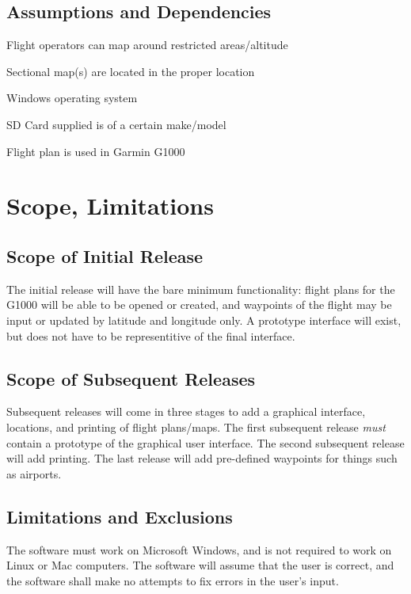 \documentclass[12pt, letterpaper]{article}
\begin{document}
  \subsection{Assumptions and Dependencies}
     \begin{description}
      \setlength{\itemsep}{1pt}
      \setlength{\parskip}{0pt}
      \setlength{\parsep}{0pt}
      \item[AS-01] Flight operators can map around restricted areas/altitude
      \item[AS-02] Sectional map(s) are located in the proper location\\
      \item[DE-01] Windows operating system
      \item[DE-02] SD Card supplied is of a certain make/model
      \item[DE-03] Flight plan is used in Garmin G1000
    \end{description}
\section{Scope, Limitations}
\subsection{Scope of Initial Release}
The initial release will have the bare minimum functionality:
    flight plans for the G1000 will be able to be opened or created,
    and waypoints of the flight may be input or updated by latitude and longitude only.
A prototype interface will exist, but does not have to be representitive of the final interface.

\subsection{Scope of Subsequent Releases}
Subsequent releases will come in three stages to add a graphical interface, locations, and printing of flight plans/maps.
The first subsequent release \emph{must} contain a prototype of the graphical user interface.
The second subsequent release will add printing.
The last release will add pre-defined waypoints for things such as airports.

\subsection{Limitations and Exclusions}
The software must work on Microsoft Windows, and is not required to work on Linux or Mac computers.
The software will assume that the user is correct,
    and the software shall make no attempts to fix errors in the user's input.
\end{document}
